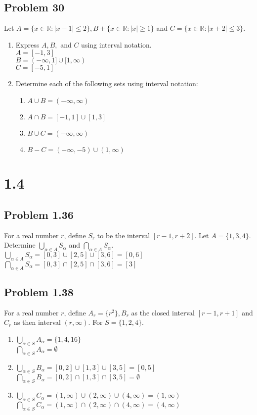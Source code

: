 \documentclass{article}
\newcommand{\R}{\mathbb{R}}
\begin{document}
	\subsection*{Problem 30}
	Let $A=\{x\in\R:|x-1|\leq2\},B+\{x\in\R:|x|\geq1\}$ and $C=\{x\in\R:|x+2|\leq3\}$.
	\begin{enumerate}[label=(\alph*)]
		\item Express $A,B,$ and $C$ using interval notation.\\
		$A=[-1,3]$\\
		$B=(-\infty,1]\cup[1,\infty)$\\
		$C=[-5,1]$
		\item Determine each of the following sets using interval notation:\\
		\begin{enumerate}[label=(\arabic*)]
			\item $A\cup B=(-\infty,\infty)$\\
			\item $A\cap B=[-1,1]\cup[1,3]$
			\item $B\cup C=(-\infty,\infty)$
			\item $B-C=(-\infty,-5)\cup(1,\infty)$
		\end{enumerate}
	\end{enumerate}
	
	\section*{1.4}
	\subsection*{Problem 1.36}
	For a real number $r$, define $S_r$ to be the interval $[r-1,r+2]$. Let $A=\{1,3,4\}$. Determine $\bigcup_{\alpha\in A}S_\alpha$ and $\bigcap_{\alpha\in A}S_\alpha$.\\
	$\bigcup_{\alpha\in A}S_\alpha=[0,3]\cup[2,5]\cup[3,6]=[0,6]$\\
	$\bigcap_{\alpha\in A}S_\alpha=[0,3]\cap[2,5]\cap[3,6]=[3]$
	\subsection*{Problem 1.38}
	For a real number $r$, define $A_r=\{r^2\},B_r$ as the closed interval $[r-1,r+1]$ and $C_r$ as then interval $(r,\infty)$. For $S=\{1,2,4\}$.
	\begin{enumerate}[label=(\alph*)]
		\item 
		$\bigcup_{\alpha\in S}A_\alpha=\{1,4,16\}$\\
		$\bigcap_{\alpha\in S}A_\alpha=\emptyset$
		
		\item
		$\bigcup_{\alpha\in S}B_\alpha=[0,2]\cup[1,3]\cup[3,5]=[0,5]$\\
		$\bigcap_{\alpha\in S}B_\alpha=[0,2]\cap[1,3]\cap[3,5]=\emptyset$
		\item
		$\bigcup_{\alpha\in S}C_\alpha=(1,\infty)\cup(2,\infty)\cup(4,\infty)=(1,\infty)$\\
		$\bigcap_{\alpha\in S}C_\alpha=(1,\infty)\cap(2,\infty)\cap(4,\infty)=(4,\infty)$
	\end{enumerate}
\end{document}
